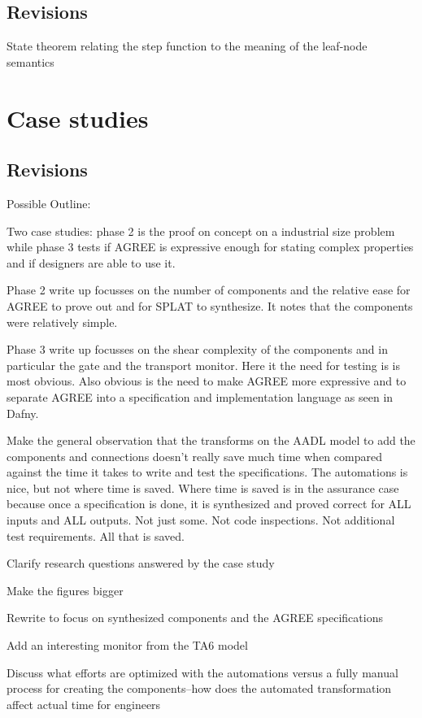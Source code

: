 \documentclass[global,twocolumn]{svjour}
\begin{document}
\subsection{Revisions}
\begin{compactitem}
  \item State theorem relating the step function to the meaning of the leaf-node semantics
\end{compactitem}

\section{Case studies}
\label{sec:case-study}


\subsection{Revisions}
\begin{compactitem}
  \item Possible Outline:
  \begin{compactitem}
    \item Two case studies: phase 2 is the proof on concept on a industrial size problem while phase 3 tests if AGREE is expressive enough for stating complex properties and if designers are able to use it.
    \item Phase 2 write up focusses on the number of components and the relative ease for AGREE to prove out and for SPLAT to synthesize. It notes that the components were relatively simple.
    \item Phase 3 write up focusses on the shear complexity of the components and in particular the gate and the transport monitor. Here it the need for testing is is most obvious. Also obvious is the need to make AGREE more expressive and to separate AGREE into a specification and implementation language as seen in Dafny.
    \item Make the general observation that the transforms on the AADL model to add the components and connections doesn't really save much time when compared against the time it takes to write and test the specifications. The automations is nice, but not where time is saved. Where time is saved is in the assurance case because once a specification is done, it is synthesized and proved correct for ALL inputs and ALL outputs. Not just some. Not code inspections. Not additional test requirements. All that is saved.
  \end{compactitem}
  \item Clarify research questions answered by the case study
  \item Make the figures bigger
  \item Rewrite to focus on synthesized components and the AGREE specifications
  \item Add an interesting monitor from the TA6 model
  \item Discuss what efforts are optimized with the automations versus a fully manual process for creating the components--how does the automated transformation affect actual time for engineers
\end{compactitem}
\end{document}
